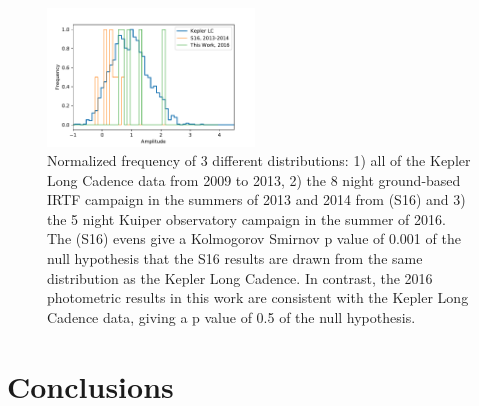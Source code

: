 \documentclass[preprint]{aastex61}
\begin{document}
\begin{figure}[!hbtp]
\begin{centering}
\includegraphics[width=0.49\textwidth]{images/kepler/amp_distributions_comparison.pdf}
\caption{Normalized frequency of 3 different distributions: 1) all of the Kepler Long Cadence data from 2009 to 2013, 2) the 8 night ground-based IRTF campaign in the summers of 2013 and 2014 from \citet{schlawin2016kic1255} (S16) and 3) the 5 night Kuiper observatory campaign in the summer of 2016.
The \citet{schlawin2016kic1255} (S16) evens give a Kolmogorov Smirnov p value of 0.001 of the null hypothesis that the S16 results are drawn from the same distribution as the Kepler Long Cadence.
In contrast, the 2016 photometric results in this work are consistent with the Kepler Long Cadence data, giving a  p value of 0.5 of the null hypothesis.}\label{fig:histoPhot}
\end{centering}
\end{figure}


%
%



\section{Conclusions}\label{sec:conclusions}
\end{document}
